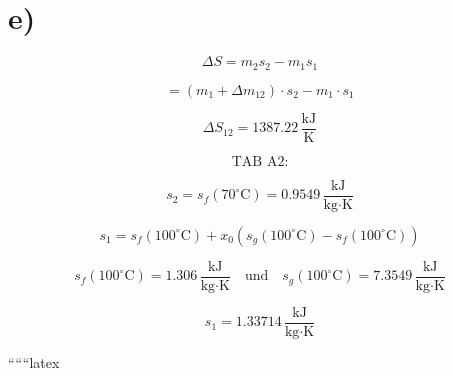 

\section*{e)}

\[
\Delta S = m_2 s_2 - m_1 s_1
\]

\[
= (m_1 + \Delta m_{12}) \cdot s_2 - m_1 \cdot s_1
\]

\[
\Delta S_{12} = 1387.22 \, \frac{\text{kJ}}{\text{K}}
\]

\[
\text{TAB A2:}
\]

\[
s_2 = s_f (70^\circ \text{C}) = 0.9549 \, \frac{\text{kJ}}{\text{kg} \cdot \text{K}}
\]

\[
s_1 = s_f (100^\circ \text{C}) + x_0 (s_g (100^\circ \text{C}) - s_f (100^\circ \text{C}))
\]

\[
s_f (100^\circ \text{C}) = 1.306 \, \frac{\text{kJ}}{\text{kg} \cdot \text{K}} \quad \text{und} \quad s_g (100^\circ \text{C}) = 7.3549 \, \frac{\text{kJ}}{\text{kg} \cdot \text{K}}
\]

\[
s_1 = 1.33714 \, \frac{\text{kJ}}{\text{kg} \cdot \text{K}}
\]

``````latex